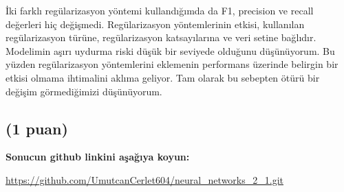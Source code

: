 \documentclass[11pt]{article}
\begin{document}
İki farklı regülarizasyon yöntemi kullandığımda da F1, precision ve recall değerleri hiç değişmedi.
Regülarizasyon yöntemlerinin etkisi, kullanılan regülarizasyon türüne, regülarizasyon katsayılarına ve veri setine bağlıdır. Modelimin aşırı uydurma riski düşük bir seviyede olduğunu düşünüyorum. Bu yüzden regülarizasyon yöntemlerini eklemenin performans üzerinde belirgin bir etkisi olmama ihtimalini aklıma geliyor. Tam olarak bu sebepten ötürü bir değişim görmediğimizi düşünüyorum.

\subsection{(1 puan)} \textbf{Sonucun github linkini  aşağıya koyun:}

\url{https://github.com/UmutcanCerlet604/neural_networks_2_1.git}
\end{document}
